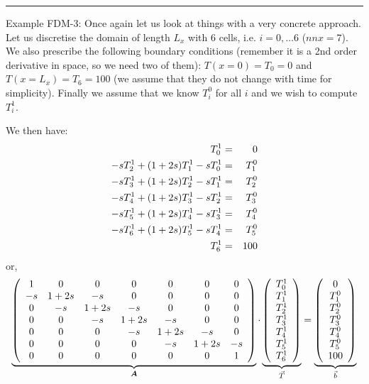 \begin{center}
\begin{minipage}[t]{0.77\textwidth}
\par\noindent\rule{\textwidth}{0.4pt}
{\color{blue} Example FDM-3}: 
Once again let us look at things with a very concrete approach. Let us discretise the 
domain of length $L_x$ with 6 cells, i.e. $i=0,\dots 6$ ($nnx=7$).
We also prescribe the following boundary conditions (remember it is a 2nd order derivative in space, 
so we need two of them): $T(x=0)=T_0=0$ and $T(x=L_x)=T_6=100$ (we assume that they 
do not change with time for simplicity). Finally we assume that we 
know $T_i^0$ for all $i$ and we wish to compute $T_i^1$.

We then have:
\begin{eqnarray}
T_0^1 &=& 0 \nonumber\\
-s T_{2}^{1} + (1+2s) T_{1}^{1} - s T_{0}^{1} &=& T_1^{0} \nonumber\\
-s T_{3}^{1} + (1+2s) T_{2}^{1} - s T_{1}^{1} &=& T_2^{0} \nonumber\\
-s T_{4}^{1} + (1+2s) T_{3}^{1} - s T_{2}^{1} &=& T_3^{0} \nonumber\\
-s T_{5}^{1} + (1+2s) T_{4}^{1} - s T_{3}^{1} &=& T_4^{0} \nonumber\\
-s T_{6}^{1} + (1+2s) T_{5}^{1} - s T_{4}^{1} &=& T_5^{0} \nonumber\\
T_6^1 &=& 100
\end{eqnarray}
or, 
\begin{equation}
\underbrace{
\left(
\begin{array}{ccccccc}
1 & 0 & 0 & 0 & 0 & 0 & 0  \\
-s & 1+2s & -s & 0 & 0 & 0 & 0 \\
0 & -s & 1+2s & -s & 0 & 0 & 0 \\
0 & 0 & -s & 1+2s & -s & 0 & 0 \\
0 & 0 & 0 & -s & 1+2s & -s & 0 \\
0 & 0 & 0 & 0 & -s & 1+2s & -s \\
0 & 0 & 0 & 0 & 0 & 0 & 1
\end{array}
\right)
}_{\bm A}
\cdot
\underbrace{
\left(
\begin{array}{ccccccc}
T_0^1 \\ T_1^1 \\ T_2^1 \\ T_3^1 \\ T_4^1 \\ T_5^1 \\ T_6^1  
\end{array}
\right)
}_{\vec{T}}
=
\underbrace{
\left(
\begin{array}{ccccccc}
0 \\ T_1^0\\ T_2^0\\ T_3^0\\ T_4^0\\ T_5^0 \\ 100
\end{array}
\right)
}_{\vec{b}} \nonumber
\end{equation}


\end{minipage}
\end{center}
